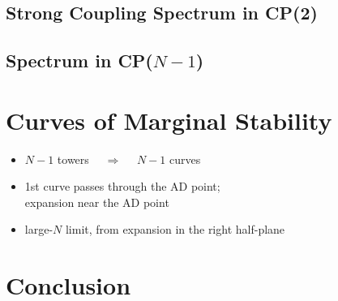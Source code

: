 \documentclass[epsfig,12pt]{article}
\begin{document}
\subsection{Strong Coupling Spectrum in CP(2)}
\vspace{2.0cm}

\subsection{Spectrum in CP($N-1$)}
\vspace{2.0cm}


\section{Curves of Marginal Stability}

\begin{itemize}

\item
	$ N - 1 $ towers ~~$ \Longrightarrow $~~ $ N - 1 $ curves

\item
	1st curve passes through the AD point;\\
	expansion near the AD point

\item
	large-$N$ limit, from expansion in the right half-plane

\end{itemize}
\vspace{2.0cm}

\section{Conclusion}
\end{document}
